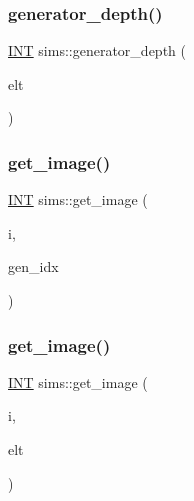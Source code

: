 \mbox{\label{classsims_a0cc71edeac2341268435d5bbeb73fb8d}} 
\subsubsection{\texorpdfstring{generator\+\_\+depth()}{generator\_depth()}\hspace{0.1cm}{\footnotesize\ttfamily [2/2]}}
{\footnotesize\ttfamily \mbox{\hyperlink{galois_8h_a09fddde158a3a20bd2dcadb609de11dc}{I\+NT}} sims\+::generator\+\_\+depth (\begin{DoxyParamCaption}\item[{\mbox{\hyperlink{galois_8h_a09fddde158a3a20bd2dcadb609de11dc}{I\+NT}} $\ast$}]{elt }\end{DoxyParamCaption})}

\mbox{\label{classsims_ae649dbf5a9440550c1ca4e402c4b4b16}} 
\subsubsection{\texorpdfstring{get\+\_\+image()}{get\_image()}\hspace{0.1cm}{\footnotesize\ttfamily [1/2]}}
{\footnotesize\ttfamily \mbox{\hyperlink{galois_8h_a09fddde158a3a20bd2dcadb609de11dc}{I\+NT}} sims\+::get\+\_\+image (\begin{DoxyParamCaption}\item[{\mbox{\hyperlink{galois_8h_a09fddde158a3a20bd2dcadb609de11dc}{I\+NT}}}]{i,  }\item[{\mbox{\hyperlink{galois_8h_a09fddde158a3a20bd2dcadb609de11dc}{I\+NT}}}]{gen\+\_\+idx }\end{DoxyParamCaption})}

\mbox{\label{classsims_a7edd11da196628bd8f070786625e359d}} 
\subsubsection{\texorpdfstring{get\+\_\+image()}{get\_image()}\hspace{0.1cm}{\footnotesize\ttfamily [2/2]}}
{\footnotesize\ttfamily \mbox{\hyperlink{galois_8h_a09fddde158a3a20bd2dcadb609de11dc}{I\+NT}} sims\+::get\+\_\+image (\begin{DoxyParamCaption}\item[{\mbox{\hyperlink{galois_8h_a09fddde158a3a20bd2dcadb609de11dc}{I\+NT}}}]{i,  }\item[{\mbox{\hyperlink{galois_8h_a09fddde158a3a20bd2dcadb609de11dc}{I\+NT}} $\ast$}]{elt }\end{DoxyParamCaption})}

